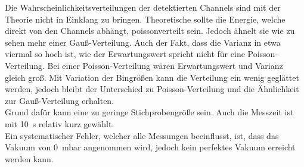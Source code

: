 \noindent Die Wahrscheinlichkeitsverteilungen der detektierten Channels sind mit der Theorie nicht in Einklang zu bringen. 
Theoretische sollte die Energie, welche direkt von den Channels abhängt, poissonverteilt sein. Jedoch ähnelt sie 
wie zu sehen mehr einer Gauß-Verteilung. Auch der Fakt, dass die Varianz in etwa viermal so hoch ist, wie der 
Erwartungswert spricht nicht für eine Poisson-Verteilung. Bei einer Poisson-Verteilung wären Erwartungswert und Varianz 
gleich groß. Mit Variation der Bingrößen kann die Verteilung ein wenig geglättet werden, jedoch bleibt der Unterschied 
zu Poisson-Verteilung und die Ähnlichkeit zur Gauß-Verteilung erhalten. \\
\noindent Grund dafür kann eine zu geringe Stichprobengröße sein. Auch die Messzeit ist mit \qty{10}{\second} relativ 
kurz gewählt.\\
\noindent Ein systematischer Fehler, welcher alle Messungen beeinflusst, ist, dass das Vakuum von \qty{0}{\milli \bar} 
angenommen wird, jedoch kein perfektes Vakuum erreicht werden kann.



